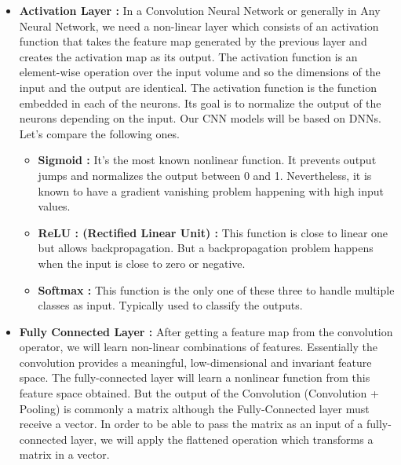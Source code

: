 \documentclass[a4paper]{article}
\begin{document}
\begin{itemize}
    \item{\textbf{Activation Layer :}
    In a Convolution Neural Network or generally in Any Neural Network, we need a non-linear layer which consists of an  activation function that takes the feature map generated by the previous layer and creates the activation map as its output.
    The activation function is an element-wise operation over the input volume and so the dimensions of the input and the output are identical.\cite{nonlinear}
    The activation function is the function embedded in each of the neurons. Its goal is to normalize the output of the neurons depending on the input.
    Our CNN models will be based on DNNs. %
    Let’s compare the following ones.
    \begin{itemize}
        \item{\textbf{Sigmoid :}  
        It’s the most known nonlinear function. It prevents output jumps and normalizes the output between 0 and 1. Nevertheless, it is known to have a gradient vanishing problem happening with high input values.
        }
        \item{\textbf{ReLU : (Rectified Linear Unit) : }
        This function is close to linear one but allows backpropagation. But a backpropagation problem happens when the input is close to zero or negative.
}
    \item{\textbf{Softmax :}
        This function is the only one of these three to handle multiple classes as input. Typically used to classify the outputs.
        }
        
    \end{itemize}

}

\item{\textbf{Fully Connected Layer :}
 After getting a feature map from the convolution operator, we will learn non-linear combinations of features. Essentially the convolution provides a meaningful, low-dimensional and invariant feature space. The fully-connected layer will learn a nonlinear function from this feature space obtained.
 But the output of the Convolution (Convolution + Pooling) is commonly a matrix although
 the Fully-Connected layer must receive a vector. In order to be able to pass the matrix as an input of a fully-connected layer, we will apply the flattened operation which transforms a matrix in a vector.
}
\end{itemize}
\end{document}
